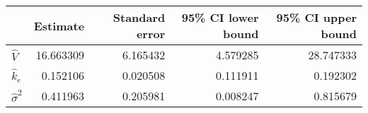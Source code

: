 \begin{tabular}{lrrrr}
\toprule
{} &   Estimate &  Standard error &  95\% CI lower bound &  95\% CI upper bound \\
\midrule
$\hat{V}$        &  16.663309 &        6.165432 &             4.579285 &            28.747333 \\
$\hat{k}_e$      &   0.152106 &        0.020508 &             0.111911 &             0.192302 \\
$\hat{\sigma}^2$ &   0.411963 &        0.205981 &             0.008247 &             0.815679 \\
\bottomrule
\end{tabular}
